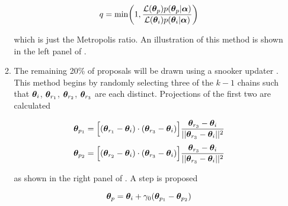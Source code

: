 \begin{enumerate}
\begin{enumerate}
\vspace{-20pt}

\begin{equation}
q = \mathrm{min} \bigg( 1, \frac{\mathcal{L}(\boldsymbol{\theta}_p) p(\boldsymbol{\theta}_p|\boldsymbol{\alpha})}
{\mathcal{L}(\boldsymbol{\theta}_i) p(\boldsymbol{\theta}_i|\boldsymbol{\alpha})} \bigg)
\label{eq:elifetime_fit_mcmc_acc_demc}
\end{equation}

\noindent which is just the Metropolis ratio.  An illustration of this method is shown in the left panel of
.

\item \label{itm:update_demc_snooker} The remaining 20\% of proposals will be drawn using a snooker updater
.  This method begins by randomly selecting three of the
$k - 1$ chains such that $\boldsymbol{\theta}_i$, $\boldsymbol{\theta}_{r_1}$,
$\boldsymbol{\theta}_{r_2}$, $\boldsymbol{\theta}_{r_3}$ are each distinct.  Projections of the first two are calculated

\vspace{-35pt}

\begin{subequations}
\begin{align}
\boldsymbol{\theta}_{p_1} = \Big[ (\boldsymbol{\theta}_{r_1} - \boldsymbol{\theta}_i) \cdot
(\boldsymbol{\theta}_{r_3} - \boldsymbol{\theta}_i) \Big]
\frac{\boldsymbol{\theta}_{r_3} - \boldsymbol{\theta}_i}{||\boldsymbol{\theta}_{r_3} - \boldsymbol{\theta}_i||^2}
\label{eq:elifetime_fit_mcmc_de_snooker_proj1}
\\[3pt]
\boldsymbol{\theta}_{p_2} = \Big[ (\boldsymbol{\theta}_{r_2} - \boldsymbol{\theta}_i) \cdot
(\boldsymbol{\theta}_{r_3} - \boldsymbol{\theta}_i) \Big]
\frac{\boldsymbol{\theta}_{r_3} - \boldsymbol{\theta}_i}{||\boldsymbol{\theta}_{r_3} - \boldsymbol{\theta}_i||^2}
\label{eq:elifetime_fit_mcmc_de_snooker_proj2}
\end{align}
\label{eq:elifetime_fit_mcmc_de_snooker_projs}
\end{subequations}

\vspace{-25pt}

\noindent as shown in the right panel of .  A step is proposed

\vspace{-10pt}

\begin{equation}
\boldsymbol{\theta}_p = \boldsymbol{\theta}_i + \gamma_0 (\boldsymbol{\theta}_{p_1} - \boldsymbol{\theta}_{p_2})
\label{eq:elifetime_fit_mcmc_update_snooker}
\end{equation}


\end{enumerate}
\end{enumerate}

